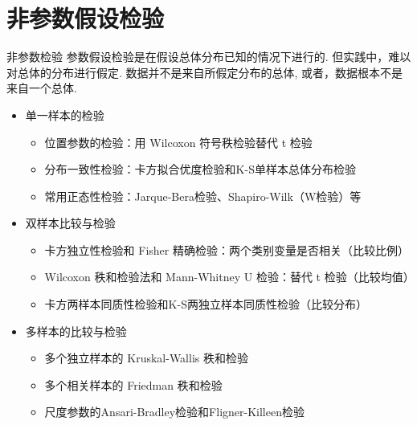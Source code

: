 \documentclass[presentation]{beamer}
\begin{document}
\section{非参数假设检验}
\label{sec:org7a34638}
\begin{frame}[label={sec:orgc40316e}]{非参数检验}
参数假设检验是在假设总体分布已知的情况下进行的. 但实践中，难以对总体的分布进行假定. 数据并不是来自所假定分布的总体, 或者，数据根本不是来自一个总体.

\begin{itemize}
\item 单一样本的检验
\begin{itemize}
\item 位置参数的检验：用 Wilcoxon 符号秩检验替代 t 检验
\item 分布一致性检验：卡方拟合优度检验和K-S单样本总体分布检验
\item 常用正态性检验：Jarque-Bera检验、Shapiro-Wilk（W检验）等
\end{itemize}
\item 双样本比较与检验
\begin{itemize}
\item 卡方独立性检验和 Fisher 精确检验：两个类别变量是否相关（比较比例）
\item Wilcoxon 秩和检验法和 Mann-Whitney U 检验：替代 t 检验（比较均值）
\item 卡方两样本同质性检验和K-S两独立样本同质性检验（比较分布）
\end{itemize}
\item 多样本的比较与检验
\begin{itemize}
\item 多个独立样本的 Kruskal-Wallis 秩和检验
\item 多个相关样本的 Friedman 秩和检验
\item 尺度参数的Ansari-Bradley检验和Fligner-Killeen检验
\end{itemize}
\end{itemize}
\end{frame}
\end{document}
